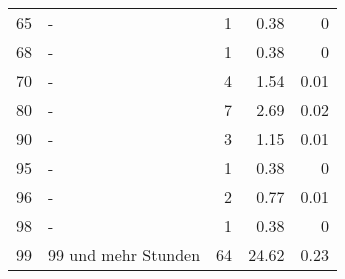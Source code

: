 \begin{longtable}{lXrrr}
        65 & \multicolumn{1}{X}{-} & %
          \num{1} &
          \num[round-mode=places,round-precision=2]{0.38} &
          \num[round-mode=places,round-precision=2]{0} \\

        68 & \multicolumn{1}{X}{-} & %
          \num{1} &
          \num[round-mode=places,round-precision=2]{0.38} &
          \num[round-mode=places,round-precision=2]{0} \\

        70 & \multicolumn{1}{X}{-} & %
          \num{4} &
          \num[round-mode=places,round-precision=2]{1.54} &
          \num[round-mode=places,round-precision=2]{0.01} \\

        80 & \multicolumn{1}{X}{-} & %
          \num{7} &
          \num[round-mode=places,round-precision=2]{2.69} &
          \num[round-mode=places,round-precision=2]{0.02} \\

        90 & \multicolumn{1}{X}{-} & %
          \num{3} &
          \num[round-mode=places,round-precision=2]{1.15} &
          \num[round-mode=places,round-precision=2]{0.01} \\

        95 & \multicolumn{1}{X}{-} & %
          \num{1} &
          \num[round-mode=places,round-precision=2]{0.38} &
          \num[round-mode=places,round-precision=2]{0} \\

        96 & \multicolumn{1}{X}{-} & %
          \num{2} &
          \num[round-mode=places,round-precision=2]{0.77} &
          \num[round-mode=places,round-precision=2]{0.01} \\

        98 & \multicolumn{1}{X}{-} & %
          \num{1} &
          \num[round-mode=places,round-precision=2]{0.38} &
          \num[round-mode=places,round-precision=2]{0} \\

        99 & \multicolumn{1}{X}{99 und mehr Stunden} & %
          \num{64} &
          \num[round-mode=places,round-precision=2]{24.62} &
          \num[round-mode=places,round-precision=2]{0.23} \\


\end{longtable}

